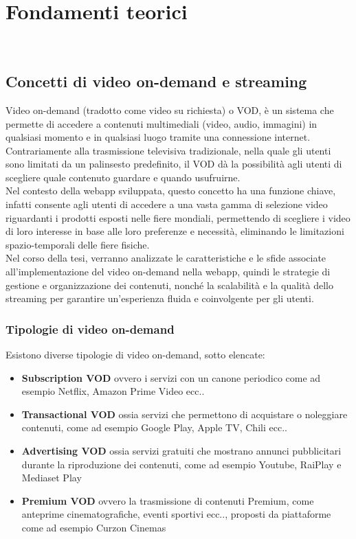 \chapter{Fondamenti teorici}
\label{cap:fondamentiteorici}
\\

\section{Concetti di video on-demand e streaming}
Video on-demand (tradotto come video su richiesta) o VOD, è un sistema che permette di accedere a contenuti multimediali (video, audio, immagini) 
in qualsiasi momento e in qualsiasi luogo tramite una connessione internet.
Contrariamente alla trasmissione televisiva tradizionale, nella quale gli utenti sono limitati da un palinsesto predefinito, 
il VOD dà la possibilità agli utenti di scegliere quale contenuto guardare e quando usufruirne.\\
Nel contesto della webapp sviluppata, questo concetto ha una funzione chiave, infatti consente agli utenti di accedere a una vasta gamma di selezione video riguardanti 
i prodotti esposti nelle fiere mondiali, 
permettendo di scegliere i video di loro interesse in base alle loro preferenze e necessità, eliminando le limitazioni spazio-temporali delle fiere fisiche.\\
Nel corso della tesi, verranno analizzate le caratteristiche e le sfide associate all'implementazione del video on-demand nella webapp, quindi le strategie 
di gestione e organizzazione dei contenuti, nonché la scalabilità e la qualità dello streaming per garantire un'esperienza fluida e coinvolgente per gli utenti.
\subsection{Tipologie di video on-demand}
Esistono diverse tipologie di video on-demand, sotto elencate:

\begin{itemize}
    \item \textbf{Subscription VOD} ovvero i servizi con un canone periodico come ad esempio Netflix, Amazon Prime Video ecc..\\
    \item \textbf{Transactional VOD} ossia servizi che permettono di acquistare o noleggiare contenuti, come ad esempio Google Play, Apple TV, Chili ecc..\\
    \item \textbf{Advertising VOD} ossia servizi gratuiti che mostrano annunci pubblicitari durante la riproduzione dei contenuti, come ad esempio Youtube, RaiPlay e Mediaset Play\\
    \item \textbf{Premium VOD} ovvero la trasmissione di contenuti Premium, come anteprime cinematografiche, eventi sportivi ecc.., proposti da piattaforme come ad esempio Curzon Cinemas\\
\end{itemize}

